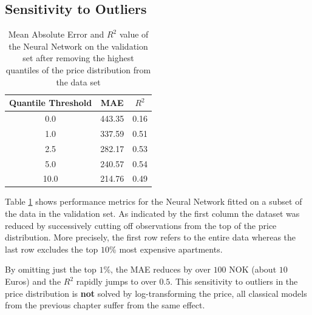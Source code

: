 \documentclass[12pt, letterpaper]{article}
\begin{document}
\subsection{Sensitivity to Outliers}

\begin{table}[t]
    \centering
    \begin{tabular}{@{}ccc@{}}
        \toprule
        \textbf{Quantile Threshold} & \textbf{MAE} & \textbf{$R^2$} \\ \midrule
        0.0                         & 443.35       & 0.16           \\
        1.0                         & 337.59       & 0.51           \\
        2.5                         & 282.17       & 0.53           \\
        5.0                         & 240.57       & 0.54           \\
        10.0                        & 214.76       & 0.49           \\ \bottomrule
    \end{tabular}
    \caption{Mean Absolute Error and $R^2$ value of the Neural Network on the validation set after removing the highest quantiles of the price distribution from the data set}
    \label{tab:mlp-outliers}
\end{table}

Table \ref{tab:mlp-outliers} shows performance metrics for the Neural Network fitted on a subset of the data in the validation set.
As indicated by the first column the dataset was reduced by successively cutting off observations from the top of the price distribution.
More precisely, the first row refers to the entire data whereas the last row excludes the top $10$\% most expensive apartments.

By omitting just the top $1$\%, the MAE reduces by over $100$ NOK (about $10$ Euros) and the $R^2$ rapidly jumps to over $0.5$.
This sensitivity to outliers in the price distribution is \textbf{not} solved by log-transforming the price, all classical models from the previous chapter suffer from the same effect.
\end{document}
